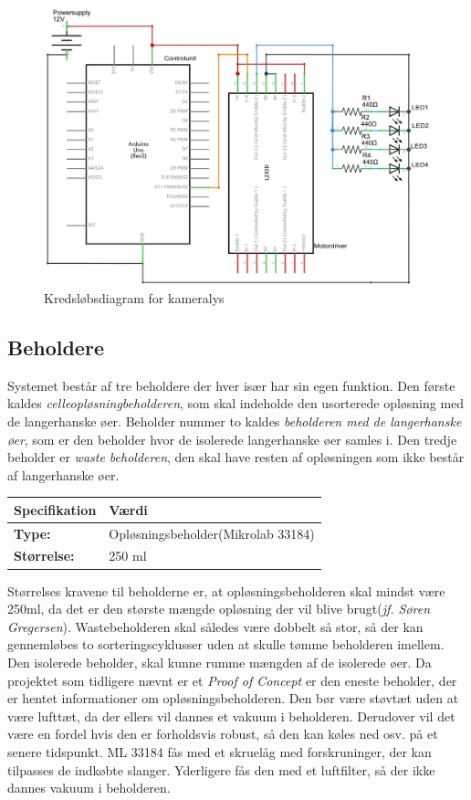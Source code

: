  \begin{figure}[H]
	\centering
	\includegraphics[width=1\textwidth]{billeder/Hardware/diagrammer/LEDdiagram.JPG}
	\caption{Kredsløbsdiagram for kameralys}
	\label{fig:LEDdiagram}
\end{figure} 


\newpage
\subsection{Beholdere}
Systemet består af tre beholdere der hver især har sin egen funktion. Den første kaldes \textit{celleopløsningbeholderen}, som skal indeholde den usorterede opløsning med de langerhanske øer. Beholder nummer to kaldes \textit{beholderen med de langerhanske øer}, som er den beholder hvor de isolerede langerhanske øer samles i. Den tredje beholder er \textit{waste beholderen}, den skal have resten af opløsningen som ikke består af langerhanske øer.
\begin{center}
		\begin{longtable}{ | m{6.5cm} | m{6.5cm}| } 
			\hline
			\textbf{Specifikation} &\textbf{Værdi} \\ 
			\hline
			\textbf{Type:} & Opløsningsbeholder(Mikrolab 33184) \\ 
			\hline
			\textbf{Størrelse:} & 250 ml \\ 
			\hline
		\end{longtable}
\end{center}
Størrelses kravene til beholderne er, at opløsningsbeholderen skal mindst være 250ml, da det er den største mængde opløsning der vil blive brugt(\textit{jf. Søren Gregersen}). Wastebeholderen skal således være dobbelt så stor, så der kan gennemløbes to sorteringscyklusser uden at skulle tømme beholderen imellem. Den isolerede beholder, skal kunne rumme mængden af de isolerede øer. Da projektet som tidligere nævnt er et \textit{Proof of Concept} er den eneste beholder, der er hentet informationer om opløsningsbeholderen. Den bør være støvtæt uden at være lufttæt, da der ellers vil dannes et vakuum i beholderen. Derudover vil det være en fordel hvis den er forholdsvis robust, så den kan køles ned osv. på et senere tidspunkt. ML 33184 fås med et skruelåg med forskruninger, der kan tilpasses de indkøbte slanger. Yderligere fås den med et luftfilter, så der ikke dannes vakuum i beholderen.


